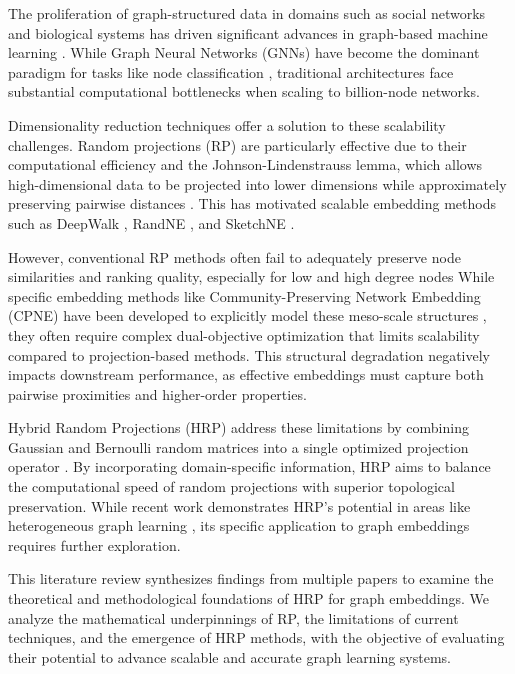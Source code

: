 \documentclass[conference]{IEEEtran}
\begin{document}
The proliferation of graph-structured data in domains such as social networks and biological systems has driven significant advances in graph-based machine learning \cite{khemani2024, gkarmpounis2024}. While Graph Neural Networks (GNNs) have become the dominant paradigm for tasks like node classification \cite{hu2020ogb}, traditional architectures face substantial computational bottlenecks when scaling to billion-node networks.

Dimensionality reduction techniques offer a solution to these scalability challenges. Random projections (RP) are particularly effective due to their computational efficiency and the Johnson-Lindenstrauss lemma, which allows high-dimensional data to be projected into lower dimensions while approximately preserving pairwise distances \cite{johnson1984, achlioptas2003}. This has motivated scalable embedding methods such as DeepWalk \cite{perozzi2014}, RandNE \cite{zhang2018randne}, and SketchNE \cite{xie2023sketchne}.

However, conventional RP methods often fail to adequately preserve node similarities and ranking quality, especially for low and high degree nodes \cite{tadic2024} While specific embedding methods like Community-Preserving Network Embedding (CPNE) have been developed to explicitly model these meso-scale structures \cite{wang2017cpne}, they often require complex dual-objective optimization that limits scalability compared to projection-based methods. This structural degradation negatively impacts downstream performance, as effective embeddings must capture both pairwise proximities and higher-order properties.

Hybrid Random Projections (HRP) address these limitations by combining Gaussian and Bernoulli random matrices into a single optimized projection operator \cite{yahaya2025hrp}. By incorporating domain-specific information, HRP aims to balance the computational speed of random projections with superior topological preservation. While recent work demonstrates HRP's potential in areas like heterogeneous graph learning \cite{hu2021rphgnn, nguyen2016}, its specific application to graph embeddings requires further exploration.

This literature review synthesizes findings from multiple papers to examine the theoretical and methodological foundations of HRP for graph embeddings. We analyze the mathematical underpinnings of RP, the limitations of current techniques, and the emergence of HRP methods, with the objective of evaluating their potential to advance scalable and accurate graph learning systems.
\end{document}
